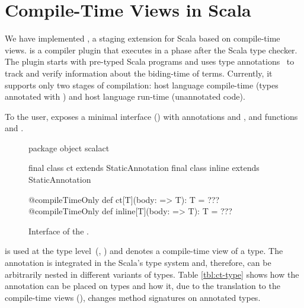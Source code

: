 \section{Compile-Time Views in Scala}
\label{sct:interface}



We have implemented \tool, a staging extension for Scala based on compile-time views.
 \tool is a compiler plugin that executes in a phase after the
 Scala type checker. The plugin starts with pre-typed Scala programs and uses
 type annotations~\cite{odersky_1996_putting} to track and verify information about the biding-time
 of terms. Currently, it supports only two stages of compilation: host language compile-time
 (types annotated with ) and host language run-time (unannotated code).

To the user, \tool exposes a minimal interface () with
annotations  and , and functions  and .

\begin{figure}
\begin{listing}
package object scalact {

  final class ct extends StaticAnnotation
  final class inline extends StaticAnnotation

  @compileTimeOnly def ct[T](body: => T): T = ???
  @compileTimeOnly def inline[T](body: => T): T = ???

}
\end{listing}
\label{fig:interface}
\caption{Interface of the \tool.}
\end{figure}

 is used at the type level~(\eg,
) and denotes a compile-time view of a type. The
annotation is integrated in the Scala's type system  and, therefore, can be
arbitrarily nested in different variants of types. Table  \ref{tbl:ct-type}
shows how the  annotation can be placed on types and how it, due to
the translation to the compile-time views (), changes
method signatures on annotated types.

